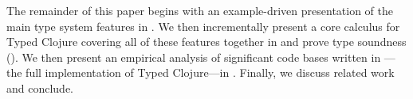 


\noindent
 The remainder of this paper begins with an example-driven
 presentation of the main type system features in
 . We then incrementally present a core calculus
 for Typed Clojure covering all of these features together in
  and prove type soundness
 (). We then 
 present an empirical analysis of significant code bases written
 in \coretyped{}---the full implementation of Typed Clojure---in . 
 Finally, we discuss related work and conclude.

